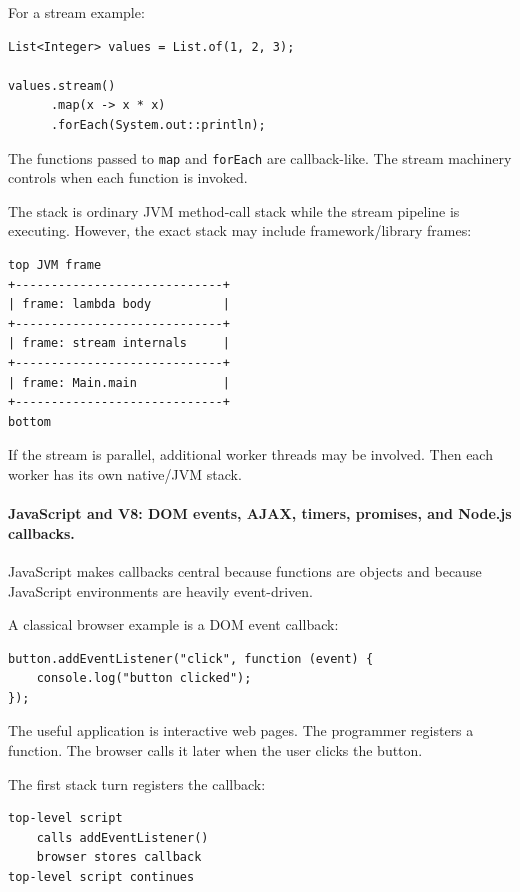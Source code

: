 For a stream example:

\begin{verbatim}
List<Integer> values = List.of(1, 2, 3);

values.stream()
      .map(x -> x * x)
      .forEach(System.out::println);
\end{verbatim}

The functions passed to \texttt{map} and \texttt{forEach} are callback-like. The stream machinery controls when each function is invoked.

The stack is ordinary JVM method-call stack while the stream pipeline is executing. However, the exact stack may include framework/library frames:

\begin{verbatim}
top JVM frame
+-----------------------------+
| frame: lambda body          |
+-----------------------------+
| frame: stream internals     |
+-----------------------------+
| frame: Main.main            |
+-----------------------------+
bottom
\end{verbatim}

If the stream is parallel, additional worker threads may be involved. Then each worker has its own native/JVM stack.

\paragraph{JavaScript and V8: DOM events, AJAX, timers, promises, and Node.js callbacks.}

JavaScript makes callbacks central because functions are objects and because JavaScript environments are heavily event-driven.

A classical browser example is a DOM event callback:

\begin{verbatim}
button.addEventListener("click", function (event) {
    console.log("button clicked");
});
\end{verbatim}

The useful application is interactive web pages. The programmer registers a function. The browser calls it later when the user clicks the button.

The first stack turn registers the callback:

\begin{verbatim}
top-level script
    calls addEventListener()
    browser stores callback
top-level script continues
\end{verbatim}

